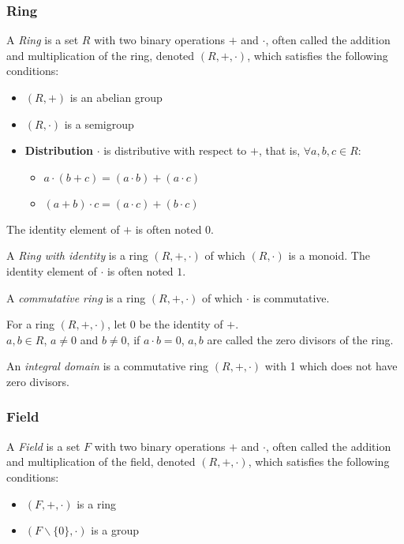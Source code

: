 \documentclass{article}
\begin{document}
    \subsubsection{Ring}
    \begin{defn}[Ring]
    	A \emph{Ring} is a set $R$ with two binary operations $+$ and $\cdot$, often called the addition and multiplication of the ring, denoted $(R,+,\cdot)$, which satisfies the following conditions:
    	\begin{itemize}
    		\item $(R,+)$ is an abelian group
    		\item $(R,\cdot)$ is a semigroup
    		\item \textbf{Distribution} $\cdot$ is distributive with respect to $+$, that is, $\forall a,b,c \in R$:
    		\begin{itemize}[label=-]
    			\item $a \cdot (b + c)=(a \cdot b) + (a \cdot c)$
    			\item $(a + b) \cdot c=(a \cdot c) + (b \cdot c)$
    		\end{itemize}
    	\end{itemize}
    	The identity element of $+$ is often noted $0$.
    \end{defn}
	\begin{defn}
		A \emph{Ring with identity} is a ring $(R,+,\cdot)$ of which $(R,\cdot)$ is a monoid. The identity element of $\cdot$ is often noted $1$.
	\end{defn}
	\begin{defn}
		A \emph{commutative ring} is a ring $(R,+,\cdot)$ of which $\cdot$ is commutative.
	\end{defn}
	\begin{defn}
		For a ring $(R,+,\cdot)$, let $0$ be the identity of $+$.\\
		$a,b\in R$, $a \neq 0$ and $b \neq 0$, if $a \cdot b=0$, $a,b$ are called the zero divisors of the ring.
	\end{defn}
	\begin{defn}
		An \emph{integral domain} is a commutative ring $(R,+,\cdot)$ with 1 which does not have zero divisors.
	\end{defn}
    \subsubsection{Field}
    \begin{defn}
    	A \emph{Field} is a set $F$ with two binary operations $+$ and $\cdot$, often called the addition and multiplication of the field, denoted $(R,+,\cdot)$, which satisfies the following conditions:
    	\begin{itemize}
    		\item $(F,+,\cdot)$ is a ring
    		\item $(F\backslash \{0\},\cdot)$ is a group
    	\end{itemize}
    \end{defn}
\end{document}
